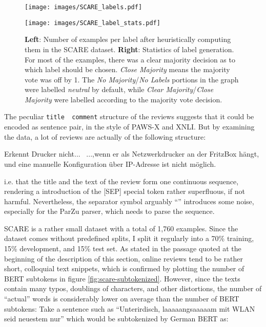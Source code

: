 \begin{figure}
  \begin{minipage}{0.45\linewidth}
  \vspace{0pt}
    \texttt{[image: images/SCARE\_labels.pdf]}
  \end{minipage}
  \hfill
  \begin{minipage}{0.45\linewidth}
  \vspace{0pt}
    \texttt{[image: images/SCARE\_label\_stats.pdf]}
  \end{minipage}
  \caption[Accumulated Gains and Losses.]{\textbf{Left}: Number of examples per label after heuristically computing them in the SCARE dataset. \textbf{Right}: Statistics of label generation. For most of the examples, there was a clear majority decision as to which label should be chosen. \emph{Close Majority} means the majority vote was off by 1. The \emph{No Majority}/\emph{No Labels} portions in the graph were labelled \emph{neutral} by default, while \emph{Clear Majority}/\emph{Close Majority}  were labelled according to the majority vote decision.}
  \label{fig:scare-stats}
\end{figure}


The peculiar \texttt{title \textbar \textbar\ comment} structure of the reviews suggests that it
could be encoded as sentence pair, in the style of PAWS-X and XNLI. But by examining the data, a
lot of reviews are actually of the following structure:

\begin{examples}
  \item Erkennt Drucker nicht... \textbar \textbar\ ...,wenn er als Netzwerkdrucker an der FritzBox hängt, und eine manuelle Konfiguration über IP-Adresse ist nicht möglich.
\end{examples}

i.e. that the title and the text of the review form one continuous sequence, rendering a introduction
of the [SEP] special token rather superfluous, if not harmful. Nevertheless, the
separator symbol arguably ``\textbar \textbar'' introduces some noise, especially for the ParZu
parser, which needs to parse the sequence.



SCARE is a rather small dataset with a total of 1,760 examples. Since the dataset comes
without predefined splits, I split it regularly into a 70\% training, 15\% development,
and 15\% test set. As \citeauthor{sanger2016scare} stated in the passage quoted at the
beginning of the description of this section, online reviews tend to be rather short,
colloquial text snippets, which is confirmed by plotting the number of BERT subtokens in
figure \ref{fig:scare-subtokenized}. However, since the texts contain many typos,
doublings of characters, and other distortions, the number of ``actual'' words is
considerably lower on average than the number of BERT subtokens: Take a sentence such
as ``Unterirdisch, laaaaangsaaaaam mit WLAN seid neuestem nur'' which would be subtokenized by German BERT as:

